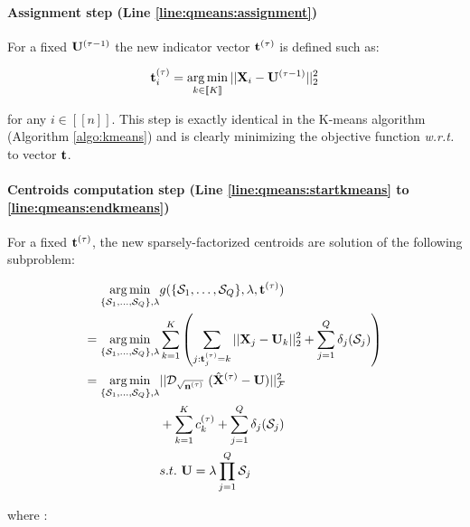 \paragraph{Assignment step (Line \ref{line:qmeans:assignment})} For a fixed ${\mathbf{U}}^{(\tau-1)}$ the new indicator vector ${\mathbf{t}}^{(\tau)}$ is defined such as:

\begin{equation}
 {\mathbf{t}}^{(\tau)}_i = \operatorname*{arg\,min}_{k \in [\![K]\!]} ||{\mathbf{X}}_i - {\mathbf{U}}^{(\tau-1)}||_2^2
\end{equation}

for any $i \in [\![n]\!]$. This step is exactly identical in the K-means algorithm (Algorithm \ref{algo:kmeans}) and is clearly minimizing the objective function \textit{w.r.t.} to vector ${\mathbf{t}}$.

\paragraph{Centroids computation step (Line \ref{line:qmeans:startkmeans} to \ref{line:qmeans:endkmeans})} For a fixed ${\mathbf{t}}^{(\tau)}$, the new sparsely-factorized centroids are solution of the following subproblem:

\begin{equation}
\label{eq:qmeans_problem_t_fixed}
\begin{split}
 \operatorname*{arg\,min}_{\{ \mathcal{S}_1, \ldots,\mathcal{S}_Q\}, \lambda} & g(\{ \mathcal{S}_1, \ldots,\mathcal{S}_Q\}, \lambda, {\mathbf{t}}^{(\tau)}) \\
 = \operatorname*{arg\,min}_{\{ \mathcal{S}_1, \ldots,\mathcal{S}_Q\}, \lambda} &\sum_{k=1}^{K} \left( \sum_{j: {\mathbf{t}}^{(\tau)}_j = k} ||{\mathbf{X}}_j - {\mathbf{U}}_k||^2_2 + \sum_{j=1}^{Q} \delta_j(\mathcal{S}_j) \right) \\
 = \operatorname*{arg\,min}_{\{ \mathcal{S}_1, \ldots,\mathcal{S}_Q\}, \lambda} & ||\mathcal{D}_{\sqrt{{\mathbf{n}}^{(\tau)}}}~(\hat{{\mathbf{X}}}^{(\tau)} - {\mathbf{U}})||_{\mathcal{F}} ^ 2  \\
 &+ \sum_{k=1}^{K} c_k^{(\tau)} + \sum_{j=1}^{Q} \delta_j(\mathcal{S}_j)\\
 & s.t. ~ {\mathbf{U}} = \lambda \prod_{j=1}^{Q}{\mathcal{S}_j}
\end{split} 
\end{equation}

where :

